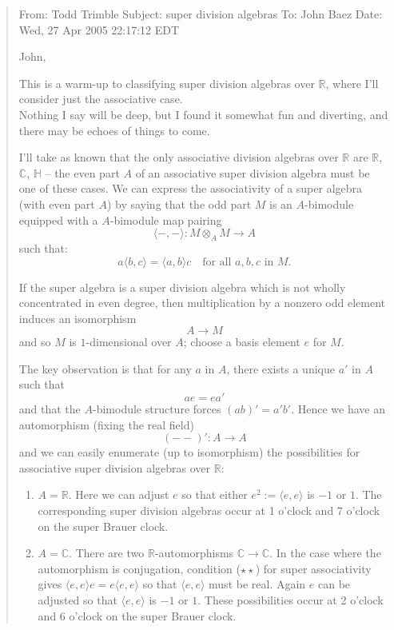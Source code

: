 \documentclass{article}
\begin{document}
\begin{quote}
From: Todd Trimble Subject: super division algebras To: John Baez Date:
Wed, 27 Apr 2005 22:17:12 EDT

John,

This is a warm-up to classifying super division algebras over
\(\mathbb{R}\), where I'll consider just the associative case.\\
Nothing I say will be deep, but I found it somewhat fun and diverting,
and there may be echoes of things to come.

I'll take as known that the only associative division algebras over
\(\mathbb{R}\) are \(\mathbb{R}\), \(\mathbb{C}\), \(\mathbb{H}\) -- the
even part \(A\) of an associative super division algebra must be one of
these cases. We can express the associativity of a super algebra (with
even part \(A\)) by saying that the odd part \(M\) is an \(A\)-bimodule
equipped with a \(A\)-bimodule map pairing
\[\langle -,-\rangle \colon M\otimes_A M \to A\] such that:
\[a\langle b,c\rangle = \langle a,b\rangle c \quad \mbox{for all $a,b,c$ in $M$.} \tag{$\star\star$}\]

If the super algebra is a super division algebra which is not wholly
concentrated in even degree, then multiplication by a nonzero odd
element induces an isomorphism \[A \to M\] and so \(M\) is
\(1\)-dimensional over \(A\); choose a basis element \(e\) for \(M\).

The key observation is that for any \(a\) in \(A\), there exists a
unique \(a'\) in \(A\) such that \[ae = ea'\] and that the
\(A\)-bimodule structure forces \((ab)' = a'b'\). Hence we have an
automorphism (fixing the real field) \[(--)'\colon A \to A\] and we can
easily enumerate (up to isomorphism) the possibilities for associative
super division algebras over \(\mathbb{R}\):

\begin{enumerate}
\def\labelenumi{\arabic{enumi}.}
\item
  \(A = \mathbb{R}\). Here we can adjust \(e\) so that either
  \(e^2 := \langle e, e\rangle\) is \(-1\) or \(1\). The corresponding
  super division algebras occur at 1 o'clock and 7 o'clock on the super
  Brauer clock.
\item
  \(A = \mathbb{C}\). There are two \(\mathbb{R}\)-automorphisms
  \(\mathbb{C} \to \mathbb{C}\). In the case where the automorphism is
  conjugation, condition (\(\star\star\)) for super associativity gives
  \(\langle e, e\rangle e = e\langle e, e\rangle\) so that
  \(\langle e, e\rangle\) must be real. Again \(e\) can be adjusted so
  that \(\langle e, e\rangle\) is \(-1\) or \(1\). These possibilities
  occur at 2 o'clock and 6 o'clock on the super Brauer clock.
\end{enumerate}


\end{quote}
\end{document}
